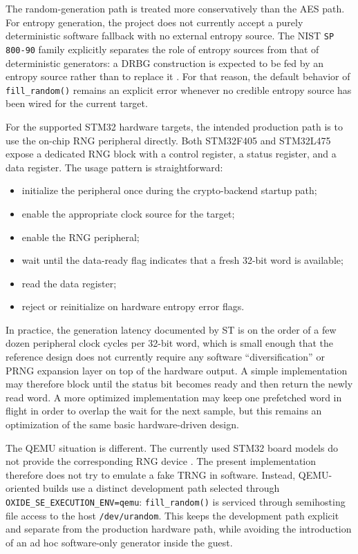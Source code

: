 The random-generation path is treated more conservatively than the AES path.
For entropy generation, the project does not currently accept a purely
deterministic software fallback with no external entropy source. The NIST
\texttt{SP 800-90} family explicitly separates the role of entropy sources from
that of deterministic generators: a DRBG construction is expected to be fed by
an entropy source rather than to replace it \cite{nist80090b,nist80090c}. For
that reason, the default behavior of \texttt{fill\_random()} remains an
explicit error whenever no credible entropy source has been wired for the
current target.

For the supported STM32 hardware targets, the intended production path is to
use the on-chip RNG peripheral directly. Both STM32F405 and STM32L475 expose a
dedicated RNG block with a control register, a status register, and a data
register. The usage pattern is straightforward:
\begin{itemize}
\item initialize the peripheral once during the crypto-backend startup path;
\item enable the appropriate clock source for the target;
\item enable the RNG peripheral;
\item wait until the data-ready flag indicates that a fresh 32-bit word is
  available;
\item read the data register;
\item reject or reinitialize on hardware entropy error flags.
\end{itemize}

In practice, the generation latency documented by ST is on the order of a few
dozen peripheral clock cycles per 32-bit word, which is small enough that the
reference design does not currently require any software ``diversification'' or
PRNG expansion layer on top of the hardware output. A simple implementation may
therefore block until the status bit becomes ready and then return the newly
read word. A more optimized implementation may keep one prefetched word in
flight in order to overlap the wait for the next sample, but this remains an
optimization of the same basic hardware-driven design.

The QEMU situation is different. The currently used STM32 board models do not
provide the corresponding RNG device \cite{qemu-stm32}. The present
implementation therefore does not try to emulate a fake TRNG in software.
Instead, QEMU-oriented builds use a distinct development path selected through
\texttt{OXIDE\_SE\_EXECUTION\_ENV=qemu}: \texttt{fill\_random()} is serviced through
semihosting file access to the host \texttt{/dev/urandom}. This keeps the
development path explicit and separate from the production hardware path, while
avoiding the introduction of an ad hoc software-only generator inside the
guest.


